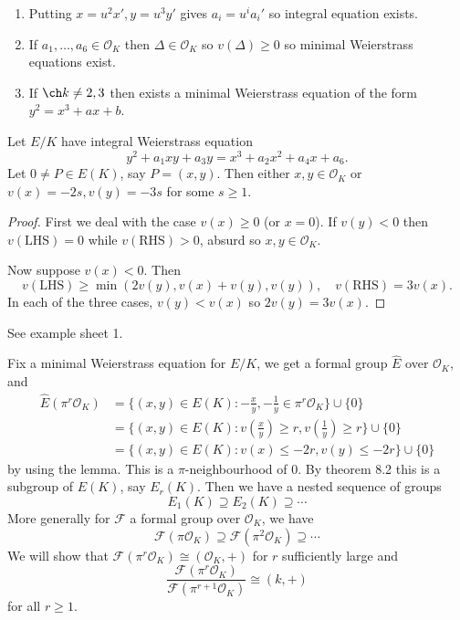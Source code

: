 \documentclass[a4paper]{article}
\theoremstyle{definition}
\theoremstyle{theorem}
\renewcommand*{\O}{\mathcal{O}}
\begin{document}
\begin{remark}\leavevmode
  \begin{enumerate}
  \item Putting \(x = u^2 x', y = u^3 y'\) gives \(a_i = u^i a_i'\) so integral equation exists.
  \item If \(a_1, \dots, a_6 \in \O_K\) then \(\Delta \in \O_K\) so \(v(\Delta) \geq 0\) so minimal Weierstrass equations exist.
  \item If \(\ch k \neq 2, 3\) then exists a minimal Weierstrass equation of the form \(y^2 = x^3 + ax + b\).
  \end{enumerate}
\end{remark}

\begin{lemma}
  Let \(E/K\) have integral Weierstrass equation
  \[
    y^2 + a_1 xy + a_3 y = x^3 + a_2 x^2 + a_4x + a_6.
  \]
  Let \(0 \neq P \in E(K)\), say \(P = (x, y)\). Then either \(x, y \in \O_K\) or \(v(x) = -2s, v(y) = -3s\) for some \(s \geq 1\).
\end{lemma}

\begin{proof}
  First we deal with the case \(v(x) \geq 0\) (or \(x = 0\)). If \(v(y) < 0\) then \(v(\mathrm{LHS}) = 0\) while \(v(\mathrm{RHS}) > 0\), absurd so \(x, y \in \O_K\).

  Now suppose \(v(x) < 0\). Then
  \[
    v(\mathrm{LHS}) \geq \min(2 v(y), v(x) + v(y), v(y)), \quad v(\mathrm{RHS}) = 3v(x).
  \]
  In each of the three cases, \(v(y) < v(x)\) so \(2v(y) = 3v(x)\).
\end{proof}

\begin{remark}
  See example sheet 1.
\end{remark}

Fix a minimal Weierstrass equation for \(E/K\), we get a formal group \(\hat E\) over \(\O_K\), and
\begin{align*}
  \hat E (\pi^r \O_K)
  &= \{(x, y) \in E(K): -\frac{x}{y}, -\frac{1}{y} \in \pi^r \O_K\} \cup \{0\} \\
  &= \{(x, y) \in E(K): v(\frac{x}{y}) \geq r, v(\frac{1}{y}) \geq r\} \cup \{0\} \\
  &= \{(x, y) \in E(K): v(x) \leq -2r, v(y) \leq -2r\} \cup \{0\}
\end{align*}
by using the lemma. This is a \(\pi\)-neighbourhood of \(0\). By theorem 8.2 this is a subgroup of \(E(K)\), say \(E_r(K)\). Then we have a nested sequence of groups
\[
  E_1(K) \supseteq E_2(K) \supseteq \cdots
\]
More generally for \(\mathcal F\) a formal group over \(\O_K\), we have
\[
  \mathcal F(\pi \O_K) \supseteq \mathcal F(\pi^2 \O_K) \supseteq \cdots
\]
We will show that \(\mathcal F(\pi^r \O_K) \cong (\O_K, +)\) for \(r\) sufficiently large and
\[
  \frac{\mathcal F(\pi^r \O_K)}{\mathcal F (\pi^{r + 1} \O_K)} \cong (k, +)
\]
for all \(r \geq 1\).
\end{document}
